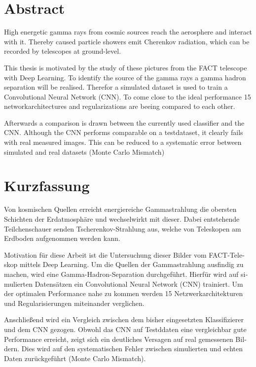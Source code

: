 \thispagestyle{plain}

\section*{Abstract}
High energetic gamma rays from cosmic sources reach the aerosphere and interact with it.
Thereby caused particle showers emit Cherenkov radiation, which can be recorded by telescopes at ground-level.

This thesis is motivated by the study of these pictures from the FACT telescope with Deep Learning.
To identify the source of the gamma rays a gamma hadron separation will be realised.
Therefor a simulated dataset is used to train a Convolutional Neural Network (CNN).
To come close to the ideal performance 15 networkarchitectures and regularizations are beeing compared to each other.

Afterwards a comparison is drawn between the currently used classifier and the CNN.
Although the CNN performs comparable on a testdataset, it clearly fails with real measured images.
This can be reduced to a systematic error between simulated and real datasets (Monte Carlo Mismatch)

\section*{Kurzfassung}
\begin{german}
Von kosmischen Quellen erreicht energiereiche Gammastrahlung die obersten Schichten der Erdatmosphäre und wechselwirkt mit dieser.
Dabei entstehende Teilchenschauer senden Tscherenkov-Strahlung aus, welche von Teleskopen am Erdboden aufgenommen werden kann.

Motivation für diese Arbeit ist die Untersuchung dieser Bilder vom FACT-Teleskop mittels Deep Learning.
Um die Quellen der Gammastrahlung ausfindig zu machen, wird eine Gamma-Hadron-Separation durchgeführt.
Hierfür wird auf simulierten Datensätzen ein Convolutional Neural Network (CNN) trainiert.
Um der optimalen Performance nahe zu kommen werden 15 Netzwerkarchitekturen und Regularisierungen miteinander verglichen.

Anschließend wird ein Vergleich zwischen dem bisher eingesetzten Klassifizierer und dem CNN gezogen.
Obwohl das CNN auf Testddaten eine vergleichbar gute Performance erreicht, zeigt sich ein deutliches Versagen auf real gemessenen Bildern.
Dies wird auf den systematischen Fehler zwischen simulierten und echten Daten zurückgeführt (Monte Carlo Mismatch).
\end{german}
